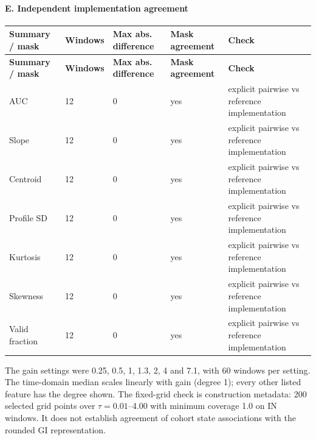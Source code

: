 \documentclass[10pt]{article}
\begin{document}
\begin{landscape}
\paragraph{E. Independent implementation agreement}\begin{longtable}{p{2.5cm}p{1.5cm}p{2.5cm}p{2cm}p{5cm}}
\toprule
\textbf{Summary / mask} & \textbf{Windows} & \textbf{Max abs. difference} & \textbf{Mask agreement} & \textbf{Check} \\
\midrule
\endfirsthead
\toprule
\textbf{Summary / mask} & \textbf{Windows} & \textbf{Max abs. difference} & \textbf{Mask agreement} & \textbf{Check} \\
\midrule
\endhead
AUC & 12 & 0 & yes & explicit pairwise vs reference implementation \\
Slope & 12 & 0 & yes & explicit pairwise vs reference implementation \\
Centroid & 12 & 0 & yes & explicit pairwise vs reference implementation \\
Profile SD & 12 & 0 & yes & explicit pairwise vs reference implementation \\
Kurtosis & 12 & 0 & yes & explicit pairwise vs reference implementation \\
Skewness & 12 & 0 & yes & explicit pairwise vs reference implementation \\
Valid fraction & 12 & 0 & yes & explicit pairwise vs reference implementation \\
\bottomrule
\end{longtable}
\par\smallskip\noindent\footnotesize The gain settings were 0.25, 0.5, 1, 1.3, 2, 4 and 7.1, with 60 windows per setting. The time-domain median scales linearly with gain (degree 1); every other listed feature has the degree shown. The fixed-grid check is construction metadata: 200 selected grid points over $\tau=0.01$--4.00 with minimum coverage 1.0 on IN windows. It does not establish agreement of cohort state associations with the rounded GI representation.
\end{landscape}
\end{document}
